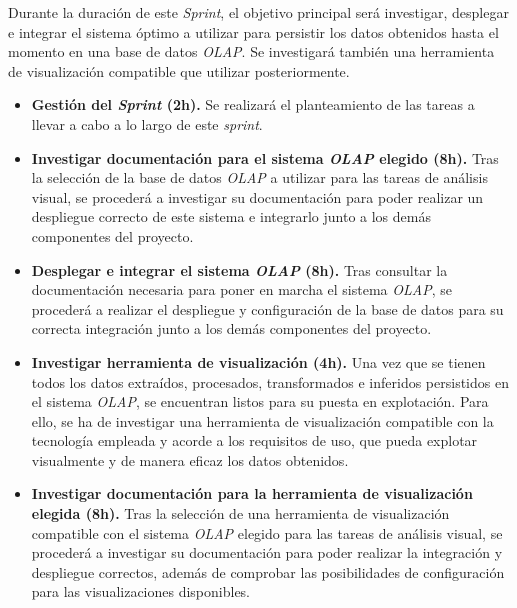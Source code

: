 Durante la duración de este \textit{Sprint}, el objetivo principal será investigar, desplegar e integrar el sistema óptimo a utilizar para persistir los datos obtenidos hasta el momento en una base de datos \textit{OLAP}. Se investigará también una herramienta de visualización compatible que utilizar posteriormente.

\begin{itemize}

    \item \textbf{Gestión del \textit{Sprint} (2h).} Se realizará el planteamiento de las tareas a llevar a cabo a lo largo de este \textit{sprint}.

    \item \textbf{Investigar documentación para el sistema \textit{OLAP} elegido (8h).} Tras la selección de la base de datos \textit{OLAP} a utilizar para las tareas de análisis visual, se procederá a investigar su documentación para poder realizar un despliegue correcto de este sistema e integrarlo junto a los demás componentes del proyecto.

    \item \textbf{Desplegar e integrar el sistema \textit{OLAP} (8h).} Tras consultar la documentación necesaria para poner en marcha el sistema \textit{OLAP}, se procederá a realizar el despliegue y configuración de la base de datos para su correcta integración junto a los demás componentes del proyecto.

    \item \textbf{Investigar herramienta de visualización (4h).} Una vez que se tienen todos los datos extraídos, procesados, transformados e inferidos persistidos en el sistema \textit{OLAP}, se encuentran listos para su puesta en explotación. Para ello, se ha de investigar una herramienta de visualización compatible con la tecnología empleada y acorde a los requisitos de uso, que pueda explotar visualmente y de manera eficaz los datos obtenidos.

    \item \textbf{Investigar documentación para la herramienta de visualización elegida (8h).} Tras la selección de una herramienta de visualización compatible con el sistema \textit{OLAP} elegido para las tareas de análisis visual, se procederá a investigar su documentación para poder realizar la integración y despliegue correctos, además de comprobar las posibilidades de configuración para las visualizaciones disponibles.

\end{itemize}

